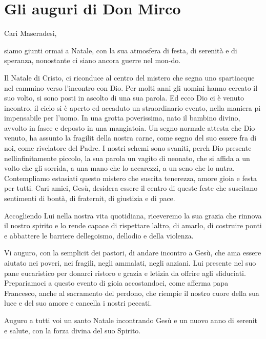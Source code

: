 \section{Gli auguri di Don Mirco}
Cari Maseradesi,

siamo giunti ormai a Natale, con la sua atmosfera di festa, di serenità e di speranza, nonostante ci siano ancora guerre nel mon-do.

Il Natale di Cristo, ci riconduce al centro del mistero che segna uno spartiacque nel cammino verso l'incontro con Dio. Per molti anni gli uomini hanno cercato il suo volto, si sono posti in ascolto di una sua parola. Ed ecco Dio ci è venuto incontro, il cielo si è aperto ed  accaduto un straordinario evento, nella maniera pi impensabile per l'uomo. In una grotta poverissima,  nato il bambino divino, avvolto in fasce e deposto in una mangiatoia. Un segno normale attesta che Dio  venuto, ha assunto la fragilit della nostra carne, come segno del suo essere fra di noi, come rivelatore del Padre. I nostri schemi sono svaniti, perch Dio  presente nellinfinitamente piccolo, la sua parola un vagito di neonato, che si affida a un volto che gli sorrida, a una mano che lo accarezzi, a un seno che lo nutra. Contempliamo estasiati questo mistero che suscita tenerezza, amore gioia e festa per tutti. Cari amici, Gesù, desidera essere il centro di queste feste che suscitano sentimenti di bontà, di fraternit, di giustizia e di pace.

Accogliendo Lui nella nostra vita quotidiana, riceveremo la sua grazia che rinnova il nostro spirito e lo rende capace di rispettare laltro, di amarlo, di costruire ponti e abbattere le barriere dellegoismo, dellodio e della violenza.

Vi auguro, con la semplicit dei pastori, di andare incontro a Gesù, che ama essere aiutato nei poveri, nei fragili, negli ammalati, negli anziani. Lui  presente nel suo pane eucaristico per donarci ristoro e grazia e letizia da offrire agli sfiduciati. Prepariamoci a questo evento di gioia accostandoci, come afferma papa Francesco, anche al sacramento del perdono, che riempie il nostro cuore della sua luce e del suo amore e cancella i nostri peccati.

Auguro a tutti voi un santo Natale incontrando Gesù e un nuovo anno di serenit e salute, con la forza divina del suo Spirito.

